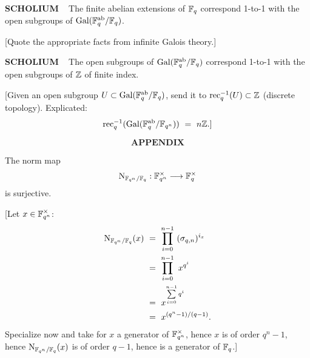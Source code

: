 \begin{x}{\small\bf SCHOLIUM} \ %
The finite abelian extensions of $\mathbb{F}_q$ correspond 1-to-1 with the open subgroups of $\text{Gal}(\mathbb{F}_q^{\text{ab}} / \mathbb{F}_q)$.

\vspace{0.1cm}

[Quote the appropriate facts from infinite Galois theory.]
\end{x}

\vspace{0.1cm}

\begin{x}{\small\bf SCHOLIUM} \ %
The open subgroups of $\text{Gal}(\mathbb{F}_q^{\text{ab}} / \mathbb{F}_q)$ correspond 1-to-1 with the open subgroups of $\mathbb{Z}$ of finite index.

\vspace{0.1cm}

[Given an open subgroup $U \subset \text{Gal}(\mathbb{F}_q^{\text{ab}} / \mathbb{F}_q)$, send it to $\text{rec}_q^{-1}(U) \subset \mathbb{Z}$ (discrete topology).  
Explicated: 
\[
\rec_q^{-1}(\Gal(\F_q^\ab / \F_{q^n})) \ = \ n\Z.]
\]
\end{x}
\vspace{0.1cm}


\[
\textbf{APPENDIX}
\]
\setcounter{theoremn}{0}

The norm map 
\[
\text{N}_{\mathbb{F}_{q^n} / \mathbb{F}_q}: \mathbb{F}_{q^n}^\times \longrightarrow \mathbb{F}_q^\times
\]
is surjective.

\vspace{0.1cm}

[Let $x \in \mathbb{F}_{q^n}^\times$:
\begin{align*}
\tN_{\F_{q^n} / \F_q}(x) \ 
&= \ \prod\limits_{i = 0}^{n-1} \ (\sigma_{q,n})^{i_x}\\
&= \ \prod\limits_{i = 0}^{n-1} \ x^{q^i}\\
&= \ x^{\sum\limits_{i = 0}^{n-1} q^i}\\
&= \ x^{(q^n - 1) / (q-1)}.
\end{align*}
Specialize now and take for $x$ a generator of $\mathbb{F}_{q^n}^\times$, hence $x$ is of order $q^n - 1$, hence 
$\text{N}_{\mathbb{F}_{q^n} / \mathbb{F}_q}(x)$ is of order $q - 1$, hence is a generator of $\mathbb{F}_q$.]













